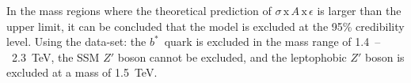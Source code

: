 
In the mass regions where the theoretical prediction of $\sigma\,\text{x}\,\mathit{A}\,\text{x}\,\epsilon$
is larger than the upper limit, it can be concluded that the model is excluded at the 95\% credibility level.
Using the \summer{} data-set:
the \mbox{$b^*$ quark} is excluded in the mass range of 1.4~--~2.3~TeV,
the SSM $Z'$ boson cannot be excluded,
and the leptophobic $Z'$ boson is excluded at a mass of 1.5~TeV.

